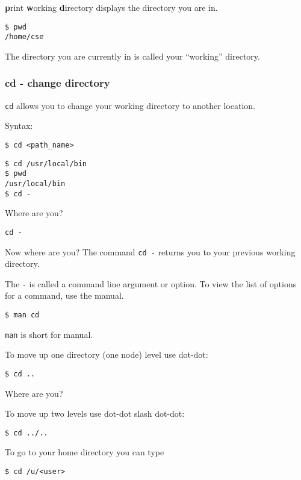 \documentclass[12pt,hidelinks]{article}
\begin{document}
\begin{appendices}
\textbf{p}rint \textbf{w}orking \textbf{d}irectory displays the
directory you are in.  

\begin{lstlisting}[style=bash]
$ pwd
/home/cse
\end{lstlisting}

The directory you are currently in is called your ``working'' directory.

\subsubsection{cd - change directory}
\texttt{cd} allows you to change your working directory to another location.

Syntax:

\begin{lstlisting}[style=bash]
$ cd <path_name>
\end{lstlisting}


\begin{lstlisting}[style=bash]
$ cd /usr/local/bin
$ pwd
/usr/local/bin
$ cd -
\end{lstlisting}

Where are you?

\begin{lstlisting}[style=bash]
cd -
\end{lstlisting}

Now where are you? The command \texttt{cd -} returns you to your previous
working directory.

The \texttt{-} is called a command line argument or option. To view
the list of options for a command, use the manual.

\begin{lstlisting}[style=bash]
$ man cd
\end{lstlisting}

\texttt{man} is short for manual.

To move up one directory (one node) level use dot-dot:
\begin{lstlisting}[style=bash]
$ cd ..
\end{lstlisting}
Where are you?

To move up two levels use dot-dot slash dot-dot:
\begin{lstlisting}[style=bash]
$ cd ../..
\end{lstlisting}

To go to your home directory you can type
\begin{lstlisting}[style=bash]
$ cd /u/<user>
\end{lstlisting}


\end{appendices}
\end{document}
